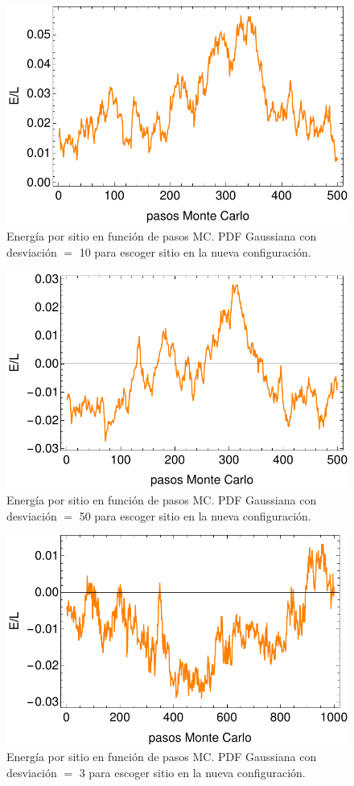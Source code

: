 \documentclass[letterpaper,superscriptaddress,aps,pra,nolongbibliography,twocolumn,showpacs,floatfix,10pt]{revtex4-2} %
\renewcommand{\>}{\rangle}
\newcommand{\<}{\langle}
\begin{document}
\begin{figure}
\centering
\includegraphics[width=0.9\columnwidth]{intento_007}
\caption{Energía por sitio en función de pasos MC. PDF Gaussiana
con desviación $=$ 10 para escoger sitio en la nueva configuración.}
\end{figure}
\begin{figure}
\centering
\includegraphics[width=0.9\columnwidth]{intento_008}
\caption{Energía por sitio en función de pasos MC. PDF Gaussiana
con desviación $=$ 50 para escoger sitio en la nueva configuración.}
\end{figure}
\begin{figure}
\centering
\includegraphics[width=0.9\columnwidth]{intento_009}
\caption{Energía por sitio en función de pasos MC. PDF Gaussiana
con desviación $=$ 3 para escoger sitio en la nueva configuración.}
\end{figure}
\end{document}
